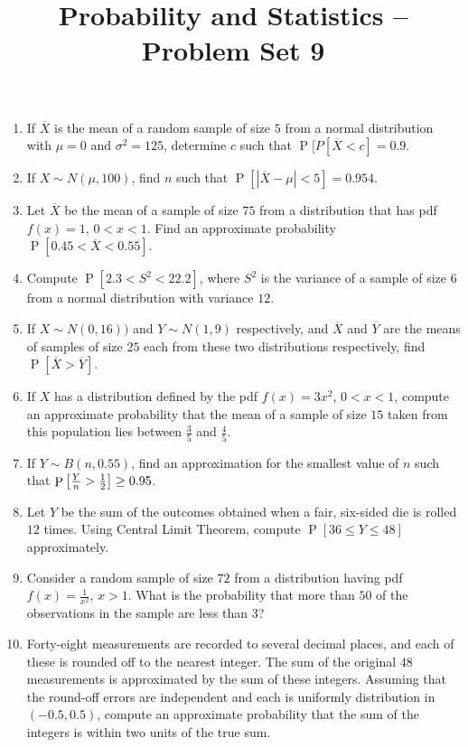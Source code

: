 \documentclass[svgnames]{amsart}
\title[]{Probability and Statistics -- Problem Set 9}
\DeclareMathOperator{\Prob}{P}
\begin{document}
\maketitle
\begin{enumerate}[leftmargin=*, itemsep=0.3em]
\item If $\overline X$ is the mean of a random sample of size $5$ from a normal distribution with $\mu = 0$ and $\sigma^2 = 125$, determine $c$ such that $\Prob[P[\overline X < c] = 0.9$.

\item If $X \sim N(\mu, 100)$, find $n$ such that $\Prob[|\overline X - \mu| < 5] = 0.954$.

\item Let $\overline X$ be the mean of a sample of size $75$ from a distribution that has pdf $f(x) = 1$, $0 < x < 1$. Find an approximate probability $\Prob[0.45 < \overline X < 0.55]$.

\item Compute $\Prob[2.3 < S^2 < 22.2]$, where $S^2$ is the variance of a sample of size $6$ from a normal distribution with variance $12$.

\item If $X \sim N(0, 16))$ and $Y \sim N(1, 9)$ respectively, and $\overline X$ and $\overline Y$ are the means of samples of size $25$ each from these two distributions respectively, find $\Prob[\overline X > \overline Y]$.

\item If $X$ has a distribution defined by the pdf $f(x) = 3x^2$, $0 < x < 1$, compute an approximate probability that the mean of a sample of size $15$ taken from this population lies between $\frac 3 5$ and $\frac 4 5$.

\item If $Y \sim B(n, 0.55)$, find an approximation for the smallest value of $n$ such that $\Prob\bqty{\frac Y n > \frac 1 2} \ge 0.95$.

\item Let $Y$ be the sum of the outcomes obtained when a fair, six-sided die is rolled $12$ times. Using Central Limit Theorem, compute $\Prob[36 \le Y \le 48]$ approximately.

\item Consider a random sample of size $72$ from a distribution having pdf $f(x) = \frac 1 {x^2}$, $x > 1$. What is the probability that more than $50$ of the observations in the sample are less than $3$?

\item Forty-eight measurements are recorded to several decimal places, and each of these is rounded off to the nearest integer. The sum of the original $48$ measurements is approximated by the sum of these integers. Assuming that the round-off errors are independent and each is uniformly distribution in $(-0.5, 0.5)$, compute an approximate probability that the sum of the integers is within two units of the true sum.


\end{enumerate}
\end{document}
